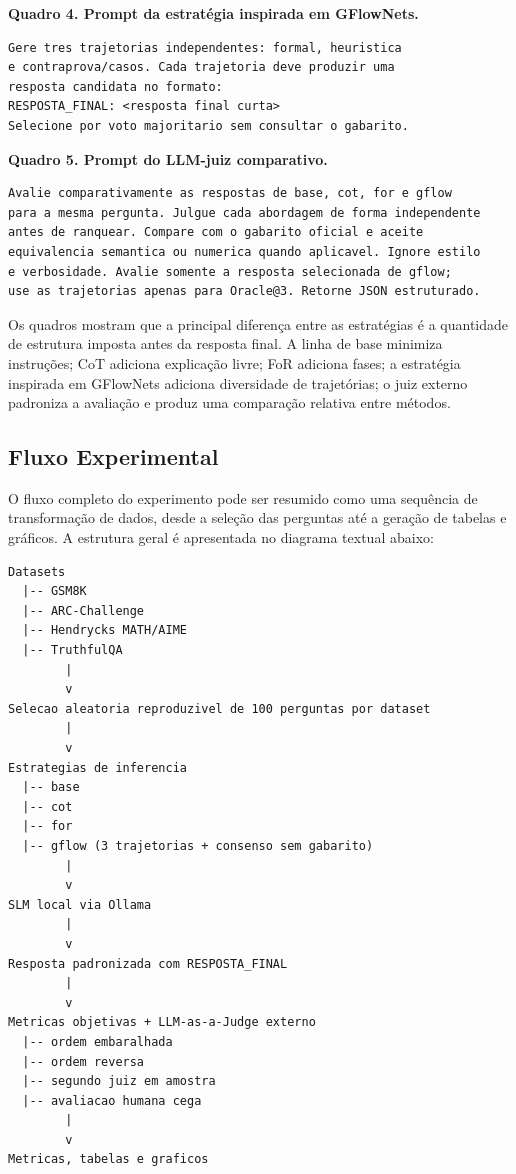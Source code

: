 \documentclass[12pt]{article}
\begin{document}
\noindent\textbf{Quadro 4. Prompt da estratégia inspirada em GFlowNets.}
\begin{verbatim}
Gere tres trajetorias independentes: formal, heuristica
e contraprova/casos. Cada trajetoria deve produzir uma
resposta candidata no formato:
RESPOSTA_FINAL: <resposta final curta>
Selecione por voto majoritario sem consultar o gabarito.
\end{verbatim}

\noindent\textbf{Quadro 5. Prompt do LLM-juiz comparativo.}
\begin{verbatim}
Avalie comparativamente as respostas de base, cot, for e gflow
para a mesma pergunta. Julgue cada abordagem de forma independente
antes de ranquear. Compare com o gabarito oficial e aceite
equivalencia semantica ou numerica quando aplicavel. Ignore estilo
e verbosidade. Avalie somente a resposta selecionada de gflow;
use as trajetorias apenas para Oracle@3. Retorne JSON estruturado.
\end{verbatim}

Os quadros mostram que a principal diferença entre as estratégias é a quantidade de estrutura imposta antes da resposta final. A linha de base minimiza instruções; CoT adiciona explicação livre; FoR adiciona fases; a estratégia inspirada em GFlowNets adiciona diversidade de trajetórias; o juiz externo padroniza a avaliação e produz uma comparação relativa entre métodos.

\subsection{Fluxo Experimental}

O fluxo completo do experimento pode ser resumido como uma sequência de transformação de dados, desde a seleção das perguntas até a geração de tabelas e gráficos. A estrutura geral é apresentada no diagrama textual abaixo:

\begin{verbatim}
Datasets
  |-- GSM8K
  |-- ARC-Challenge
  |-- Hendrycks MATH/AIME
  |-- TruthfulQA
        |
        v
Selecao aleatoria reproduzivel de 100 perguntas por dataset
        |
        v
Estrategias de inferencia
  |-- base
  |-- cot
  |-- for
  |-- gflow (3 trajetorias + consenso sem gabarito)
        |
        v
SLM local via Ollama
        |
        v
Resposta padronizada com RESPOSTA_FINAL
        |
        v
Metricas objetivas + LLM-as-a-Judge externo
  |-- ordem embaralhada
  |-- ordem reversa
  |-- segundo juiz em amostra
  |-- avaliacao humana cega
        |
        v
Metricas, tabelas e graficos
\end{verbatim}
\end{document}
